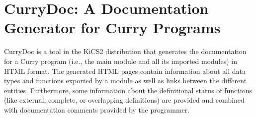 \documentclass[11pt,fleqn]{article}
\begin{document}
\newpage

\section{CurryDoc: A Documentation Generator for Curry Programs}
\label{sec-currydoc}

CurryDoc
is a tool in the KiCS2 distribution that generates
the documentation for a Curry program (i.e., the main module
and all its imported modules) in HTML format.
The generated HTML pages contain information about
all data types and functions exported by a module as well
as links between the different entities.
Furthermore, some information about the definitional status
of functions (like external, complete, or
overlapping definitions) are provided and combined with
documentation comments provided by the programmer.
\end{document}
